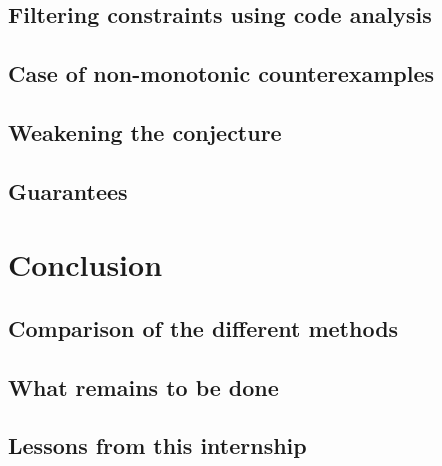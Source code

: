 \documentclass[11pt,a4paper,oldfontcommands]{memoir}
\begin{document}
    \section{Filtering constraints using code analysis}


    \section{Case of non-monotonic counterexamples}

    \section{Weakening the conjecture}


    \section{Guarantees}

\chapter{Conclusion}

    \section{Comparison of the different methods}


    \section{What remains to be done}


    \section{Lessons from this internship}




\end{document}
